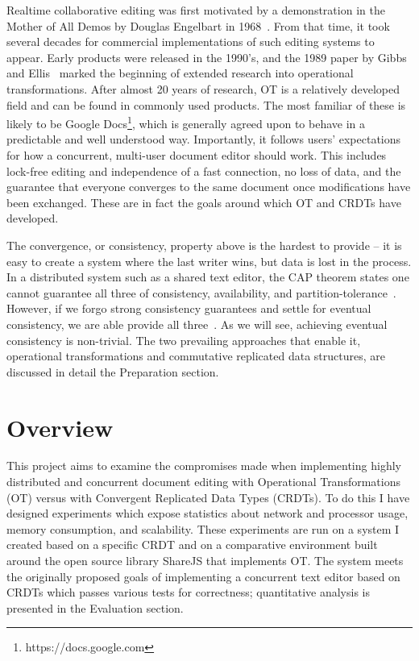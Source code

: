 \documentclass[12pt,a4paper,twoside,openright]{report}
\begin{document}
Realtime collaborative editing was first motivated by a demonstration in the Mother of All Demos by Douglas Engelbart in 1968~\cite{MotherDemo}. From that time, it took several decades for commercial implementations of such editing systems to appear. Early products were released in the 1990's, and the 1989 paper by Gibbs and Ellis~\cite{Ellis1989} marked the beginning of extended research into operational transformations. After almost 20 years of research, OT is a relatively developed field and can be found in commonly used products. The most familiar of these is likely to be Google Docs\footnote{https://docs.google.com}, which is generally agreed upon to behave in a predictable and well understood way. Importantly, it follows users' expectations for how a concurrent, multi-user document editor should work. This includes lock-free editing and independence of a fast connection, no loss of data, and the guarantee that everyone converges to the same document once modifications have been exchanged. These are in fact the goals around which OT and CRDTs have developed.

The convergence, or consistency, property above is the hardest to provide -- it is easy to create a system where the last writer wins, but data is lost in the process. In a distributed system such as a shared text editor, the CAP theorem states one cannot guarantee all three of consistency, availability, and partition-tolerance~\cite{Gilbert2005}. However, if we forgo strong consistency guarantees and settle for eventual consistency, we are able provide all three~\cite{zeller2014}. As we will see, achieving eventual consistency is non-trivial. The two prevailing approaches that enable it, operational transformations and commutative replicated data structures, are discussed in detail the Preparation section.


\section{Overview}
This project aims to examine the compromises made when implementing highly distributed and concurrent document editing with Operational Transformations (OT) versus with Convergent Replicated Data Types (CRDTs). To do this I have designed experiments which expose statistics about network and processor usage, memory consumption, and scalability. These experiments are run on a system I created based on a specific CRDT and on a comparative environment built around the open source library ShareJS that implements OT. The system meets the originally proposed goals of implementing a concurrent text editor based on CRDTs which passes various tests for correctness; quantitative analysis is presented in the Evaluation section.
\end{document}
